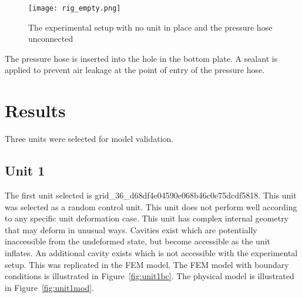 \begin{figure}[H]
	\centering
	\texttt{[image: rig\_empty.png]}
	\caption[The experimental setup without a unit]{The experimental setup with no unit in place and the pressure hose unconnected}
	\label{fig:expempty}
\end{figure}

The pressure hose is inserted into the hole in the bottom plate. A sealant is applied to prevent air leakage at the point of entry of the pressure hose.

\section{Results}

Three units were selected for model validation.

\subsection{Unit 1}

The first unit selected is grid\_36\_d68df4e04590e068b46c0e75dcdf5818. This unit was selected as a random control unit. This unit does not perform well according to any specific unit deformation case. This unit has complex internal geometry that may deform in unusual ways. Cavities exist which are potentially inaccessible from the undeformed state, but become accessible as the unit inflates. An additional cavity exists which is not accessible with the experimental setup. This was replicated in the FEM model. The FEM model with boundary conditions is illustrated in Figure~\ref{fig:unit1bc}. The physical model is illustrated in Figure~\ref{fig:unit1mod}.

